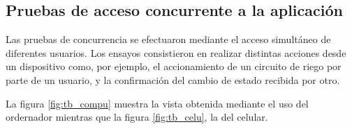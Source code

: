 \subsection{Pruebas de acceso concurrente a la aplicación}
\label{sec:Pruebas de acceso concurrente a la aplicación}



Las pruebas de concurrencia se efectuaron mediante el acceso simultáneo de diferentes usuarios. Los ensayos consistieron en realizar distintas acciones desde un dispositivo como, por ejemplo, el accionamiento de un circuito de riego por parte de un usuario, y la confirmación del cambio de estado recibida por otro. 
 
La figura \ref{fig:tb_compu} muestra la vista obtenida mediante el uso del ordernador mientras que la figura  \ref{fig:tb_celu}, la del celular.

